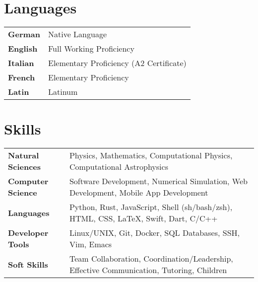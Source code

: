 \documentclass{cv}
\begin{document}
        \section{Languages}\vspace*{1mm}
        \begin{tabular}{p{3.5cm} l}
            \textbf{German}     & Native Language                           \vspace*{1mm} \\ 
            \textbf{English}    & Full Working Proficiency                  \vspace*{1mm} \\
            \textbf{Italian}    & Elementary Proficiency (A2 Certificate)   \vspace*{1mm} \\
            \textbf{French}     & Elementary Proficiency                    \vspace*{1mm} \\
            \textbf{Latin}      & Latinum
        \end{tabular}\vspace*{-3mm}
        \section{Skills}\vspace*{1mm}
        \begin{tabular}{p{3.5cm} l}
            \textbf{Natural Sciences} & Physics, Mathematics, Computational Physics, Computational Astrophysics 
            \vspace*{1mm} \\
            \textbf{Computer Science} & Software Development, Numerical Simulation, Web Development,
            Mobile App Development 
            \vspace*{1mm} \\
            \textbf{Languages} & Python, Rust, JavaScript, Shell (sh/bash/zsh), HTML, CSS, LaTeX,
            Swift, Dart, C/C++
            \vspace*{1mm} \\
            \textbf{Developer Tools} & Linux/UNIX, Git, Docker, SQL Databases, SSH, Vim, Emacs 
            \vspace*{1mm} \\
            \textbf{Soft Skills} & Team Collaboration, Coordination/Leadership, 
            Effective Communication, Tutoring, Children
        \end{tabular}\vspace*{-3mm}
\end{document}
